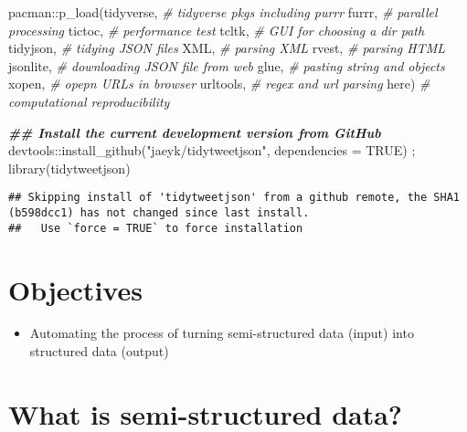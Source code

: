 \documentclass[
]{book}
\newenvironment{Shaded}{\begin{snugshade}}{\end{snugshade}}
\newcommand{\AttributeTok}[1]{\textcolor[rgb]{0.77,0.63,0.00}{#1}}
\newcommand{\CommentTok}[1]{\textcolor[rgb]{0.56,0.35,0.01}{\textit{#1}}}
\newcommand{\ConstantTok}[1]{\textcolor[rgb]{0.00,0.00,0.00}{#1}}
\newcommand{\DocumentationTok}[1]{\textcolor[rgb]{0.56,0.35,0.01}{\textbf{\textit{#1}}}}
\newcommand{\FunctionTok}[1]{\textcolor[rgb]{0.00,0.00,0.00}{#1}}
\newcommand{\NormalTok}[1]{#1}
\newcommand{\SpecialCharTok}[1]{\textcolor[rgb]{0.00,0.00,0.00}{#1}}
\newcommand{\StringTok}[1]{\textcolor[rgb]{0.31,0.60,0.02}{#1}}
\providecommand{\tightlist}{%
  \setlength{\itemsep}{0pt}\setlength{\parskip}{0pt}}
\begin{document}
\begin{Shaded}
\begin{Highlighting}[]
\NormalTok{pacman}\SpecialCharTok{::}\FunctionTok{p\_load}\NormalTok{(tidyverse, }\CommentTok{\# tidyverse pkgs including purrr}
\NormalTok{               furrr, }\CommentTok{\# parallel processing }
\NormalTok{               tictoc, }\CommentTok{\# performance test  }
\NormalTok{               tcltk, }\CommentTok{\# GUI for choosing a dir path }
\NormalTok{               tidyjson, }\CommentTok{\# tidying JSON files }
\NormalTok{               XML, }\CommentTok{\# parsing XML}
\NormalTok{               rvest, }\CommentTok{\# parsing HTML}
\NormalTok{               jsonlite, }\CommentTok{\# downloading JSON file from web}
\NormalTok{               glue, }\CommentTok{\# pasting string and objects}
\NormalTok{               xopen, }\CommentTok{\# opepn URLs in browser }
\NormalTok{               urltools, }\CommentTok{\# regex and url parsing }
\NormalTok{               here) }\CommentTok{\# computational reproducibility}

\DocumentationTok{\#\# Install the current development version from GitHub}
\NormalTok{devtools}\SpecialCharTok{::}\FunctionTok{install\_github}\NormalTok{(}\StringTok{"jaeyk/tidytweetjson"}\NormalTok{, }\AttributeTok{dependencies =} \ConstantTok{TRUE}\NormalTok{) ; }\FunctionTok{library}\NormalTok{(tidytweetjson)}
\end{Highlighting}
\end{Shaded}

\begin{verbatim}
## Skipping install of 'tidytweetjson' from a github remote, the SHA1 (b598dcc1) has not changed since last install.
##   Use `force = TRUE` to force installation
\end{verbatim}

\hypertarget{objectives-3}{%
\section{Objectives}\label{objectives-3}}

\begin{itemize}
\tightlist
\item
  Automating the process of turning semi-structured data (input) into structured data (output)
\end{itemize}

\hypertarget{what-is-semi-structured-data}{%
\section{What is semi-structured data?}\label{what-is-semi-structured-data}}
\end{document}
